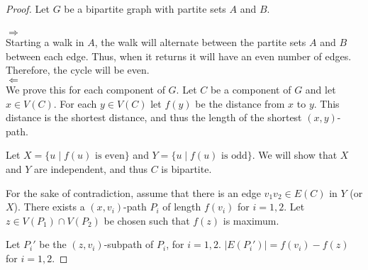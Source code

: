 \begin{proof}
	Let $G$ be a bipartite graph with partite sets $A$ and $B$.\\\\
	\noindent
	$\Rightarrow$\\
	\noindent
	Starting a walk in $A$, the walk will alternate between the partite sets $A$ and $B$ between each edge. Thus, when it returns it will have an even number of edges. Therefore, the cycle will be even.\\
	\noindent
	$\Leftarrow$\\
	\noindent
	We prove this for each component of $G$.
	Let $C$ be a component of $G$ and let $x \in V(C)$. For each $y \in V(C)$ let $f(y)$ be the distance from $x$ to $y$. This distance is the shortest distance, and thus the length of the shortest $(x,y)$-path.

	Let $X = \{u \mid f(u) \text{ is even}\}$ and $Y= \{u \mid f(u) \text{ is odd}\}$. We will show that $X$ and $Y$ are independent, and thus $C$ is bipartite.

	For the sake of contradiction, assume that there is an edge $v_{1}v_{2} \in E(C)$ in $Y$ (or $X$). There exists  a $(x,v_{i})$-path $P_{i}$ of length $f(v_{i})$ for $i = 1,2$. Let $z \in V(P_{1}) \cap V(P_2)$ be chosen such that $f(z)$ is maximum.

	Let $P_{i}'$ be the $(z,v_{i})$-subpath of $P_{i}$, for $i = 1,2$. $|E(P_{i}')| = f(v_{i}) - f(z)$ for $i = 1,2$.


\end{proof}

